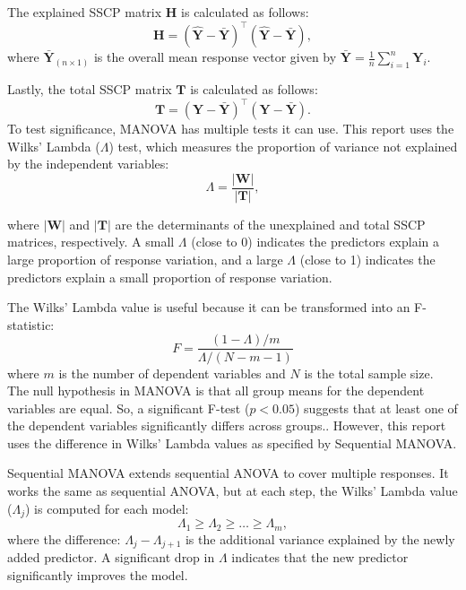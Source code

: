 \documentclass[11pt]{report} %
\begin{document}
\noindent The explained SSCP matrix \(\mathbf{H}\) is calculated as follows:
\[
\mathbf{H} = (\hat{\mathbf{Y}} - \bar{\mathbf{Y}})^\top (\hat{\mathbf{Y}} - \bar{\mathbf{Y}}),
\]
where \( \bar{\mathbf{Y}}_{(n \times 1)} \) is the overall mean response vector given by  
\(\bar{\mathbf{Y}} = \frac{1}{n} \sum_{i=1}^{n} \mathbf{Y}_i\).

\noindent Lastly, the total SSCP matrix \(\mathbf{T}\) is calculated as follows:
\[
\mathbf{T} = (\mathbf{Y} - \bar{\mathbf{Y}})^\top (\mathbf{Y} - \bar{\mathbf{Y}}).
\]
To test significance, MANOVA has multiple tests it can use. This report uses the Wilks' Lambda (\(\Lambda\)) test, which measures the proportion of variance not explained by the independent variables:
\begin{equation*}
    \Lambda = \frac{|\mathbf{W}|}{|\mathbf{T}|},
\end{equation*}

\noindent where \(|\mathbf{W}|\) and \(|\mathbf{T}|\) are the determinants of the unexplained and total SSCP matrices, respectively.\cite{manova_lesson8} A small \(\Lambda\) (close to 0) indicates the predictors explain a large proportion of response variation, and a large \(\Lambda\) (close to 1) indicates the predictors explain a small proportion of response variation.

The Wilks' Lambda value is useful because it can be transformed into an F-statistic:
\begin{equation*}
    F = \frac{(1 - \Lambda) / m}{\Lambda / (N - m - 1)}
\end{equation*}
where \( m \) is the number of dependent variables and \( N \) is the total sample size.
The null hypothesis in MANOVA is that all group means for the dependent variables are equal. So, a significant F-test (\( p < 0.05 \)) suggests that at least one of the dependent variables significantly differs across groups.\cite{Newsom2024MANOVA}. However, this report uses the difference in Wilks' Lambda values as specified by Sequential MANOVA.

Sequential MANOVA extends sequential ANOVA to cover multiple responses. It works the same as sequential ANOVA, but at each step, the Wilks' Lambda value (\(\Lambda_j\)) is computed for each model:
\begin{equation*}
    \Lambda_1 \geq \Lambda_2 \geq \dots \geq \Lambda_m,
\end{equation*}
where the difference: $\Lambda_j - \Lambda_{j+1}$ is the additional variance explained by the newly added predictor. A significant drop in \(\Lambda\) indicates that the new predictor significantly improves the model.\cite{Newsom2024MANOVA}
\end{document}
